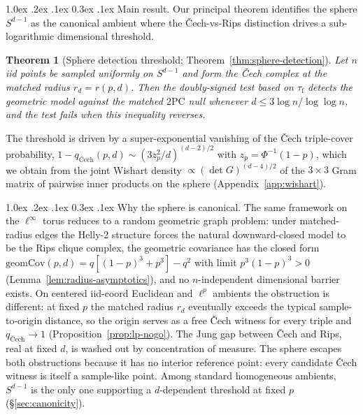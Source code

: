 \documentclass[reqno,12pt]{amsart}
\makeatletter
\renewcommand\paragraph{\@startsection{paragraph}{4}{\z@}%
  {1.0ex \@plus .2ex \@minus .1ex}%
  {0.3ex \@plus .1ex}%
  {\normalfont\normalsize\bfseries}}
\newcommand{\tauf}{\tau_{\mathrm{f}}}
\newcommand{\PC}{\mathrm{2PC}}
\newcommand{\geomCov}{\mathrm{geomCov}}
\theoremstyle{plain}
\newtheorem{theorem}{Theorem}[section]
\theoremstyle{definition}
\theoremstyle{remark}
\makeatother
\begin{document}
\paragraph{Main result.}
Our principal theorem identifies the sphere $S^{d-1}$ as the canonical ambient where the
\v{C}ech-vs-Rips distinction drives a sub-logarithmic dimensional threshold.

\begin{theorem}[Sphere detection threshold; Theorem~\ref{thm:sphere-detection}]
\label{thm:sphere-headline}
Let $n$ iid points be sampled uniformly on $S^{d-1}$ and form the \v{C}ech complex at
the matched radius $r_d = r(p, d)$. Then the doubly-signed test based on $\tauf$
detects the geometric model against the matched $\PC$ null whenever
$d \le 3 \log n / \log \log n$, and the test fails when this inequality reverses.
\end{theorem}

The threshold is driven by a super-exponential vanishing of the \v{C}ech triple-cover
probability,
$1 - q_{\text{\v{C}ech}}(p, d) \sim (3 z_p^2 / d)^{(d-2)/2}$ with $z_p = \Phi^{-1}(1-p)$,
which we obtain from the joint Wishart density $\propto (\det G)^{(d-4)/2}$ of the
$3 \times 3$ Gram matrix of pairwise inner products on the sphere
(Appendix~\ref{app:wishart}).

\paragraph{Why the sphere is canonical.}
The same framework on the $\ell^\infty$ torus reduces to a random geometric graph
problem: under matched-radius edges the Helly-2 structure forces the natural
downward-closed model to be the Rips clique complex, the geometric covariance has the
closed form $\geomCov(p, d) = q[(1-p)^3 + p^3] - q^2$ with limit $p^3(1-p)^3 > 0$
(Lemma~\ref{lem:radius-asymptotics}), and no $n$-independent dimensional
barrier exists. On centered iid-coord Euclidean and $\ell^p$ ambients the obstruction
is different: at fixed $p$ the matched radius $r_d$ eventually exceeds the typical
sample-to-origin distance, so the origin serves as a free \v{C}ech witness for every
triple and $q_{\text{\v{C}ech}} \to 1$ (Proposition~\ref{prop:lp-nogo}). The Jung gap
between \v{C}ech and Rips, real at fixed $d$, is washed out by concentration of measure.
The sphere escapes both obstructions because it has no interior reference point: every
candidate \v{C}ech witness is itself a sample-like point. Among standard homogeneous
ambients, $S^{d-1}$ is the only one supporting a $d$-dependent threshold at fixed $p$
(\S\ref{sec:canonicity}).
\end{document}
